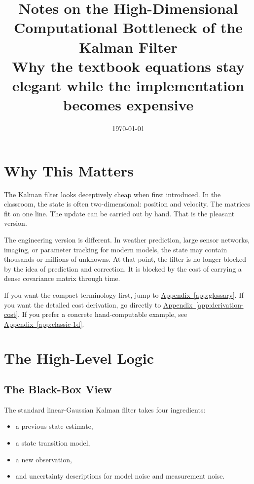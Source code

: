 \documentclass[12pt,a4paper]{article}
\title{Notes on the High-Dimensional Computational Bottleneck of the Kalman Filter\\
\large Why the textbook equations stay elegant while the implementation becomes expensive}
\author{}
\date{\today}
\begin{document}
\maketitle
\tableofcontents

\section{Why This Matters}

The Kalman filter looks deceptively cheap when first introduced. In the classroom, the state is often two-dimensional: position and velocity. The matrices fit on one line. The update can be carried out by hand. That is the pleasant version.

The engineering version is different. In weather prediction, large sensor networks, imaging, or parameter tracking for modern models, the state may contain thousands or millions of unknowns. At that point, the filter is no longer blocked by the idea of prediction and correction. It is blocked by the cost of carrying a dense covariance matrix through time.

If you want the compact terminology first, jump to \hyperref[app:glossary]{Appendix~\ref*{app:glossary}}. If you want the detailed cost derivation, go directly to \hyperref[app:derivation-cost]{Appendix~\ref*{app:derivation-cost}}. If you prefer a concrete hand-computable example, see \hyperref[app:classic-1d]{Appendix~\ref*{app:classic-1d}}.


\section{The High-Level Logic}

\subsection{The Black-Box View}

The standard linear-Gaussian Kalman filter takes four ingredients:
\begin{itemize}
  \item a previous state estimate,
  \item a state transition model,
  \item a new observation,
  \item and uncertainty descriptions for model noise and measurement noise.
\end{itemize}
\end{document}
